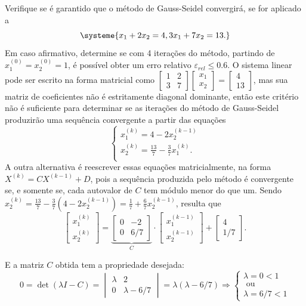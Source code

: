 \documentclass[12pt,a4paper]{article}
\begin{document}
\begin{ExerciseList}
\Exercise[title={2,5}]
Verifique se é garantido que o método de Gauss-Seidel convergirá, se for aplicado a
\[
\systeme{
 x_1 + 2x_2 = 4,
3x_1 + 7x_2 = 13.
}
\]
Em caso afirmativo, determine se com 4 iterações do método, partindo de $x_1^{(0)} = x_2^{(0)} = 1$, é possível obter um erro relativo $\varepsilon_{rel} \leq 0.6$.
\Answer O sistema linear pode ser escrito na forma matricial como
$
\begin{bmatrix}
1 & 2\\3 &7
\end{bmatrix}
\begin{bmatrix}
x_1\\x_2
\end{bmatrix}
=
\begin{bmatrix}
4\\13
\end{bmatrix}
$, mas sua matriz de coeficientes não é estritamente diagonal dominante, então este critério não é suficiente para determinar se as iterações do método de Gauss-Seidel produzirão uma sequência convergente a partir das equações
\[
\begin{cases}
x_1^{(k)} =  4 - 2x_2^{(k-1)}\\
x_2^{(k)} = \frac{13}{7} - \frac{3}{7} x_1^{(k)}.\\
\end{cases}
\]
A outra alternativa é reescrever essas equações matricialmente, na forma $X^{(k)} = C X^{(k-1)} + D$, pois a sequência produzida pelo método é convergente se, e somente se, cada autovalor de $C$ tem módulo menor do que um. Sendo $x_2^{(k)}
= \frac{13}{7} - \frac{3}{7}\left(4 - 2x_2^{(k-1)}\right)
= \frac{1}{7} + \frac{6}{7}x_2^{(k-1)}$, resulta que
\[
\begin{bmatrix}
x_1^{(k)}\\x_2^{(k)}
\end{bmatrix}
=
\underbrace{\begin{bmatrix}
0 & -2 \\ 0 & 6/7
\end{bmatrix}}_{C} \cdot
\begin{bmatrix}
x_1^{(k-1)}\\x_2^{(k-1)}
\end{bmatrix}
+
\begin{bmatrix}
4 \\ 1/7
\end{bmatrix}.
\]

E a matriz $C$ obtida tem a propriedade desejada:
\[
0 =
\det{(\lambda I - C)}
= \begin{vmatrix}
\lambda & 2 \\ 0 & \lambda - 6/7
\end{vmatrix}
= \lambda(\lambda - 6/7)
\Rightarrow
\begin{cases}
\lambda = 0 < 1\\
 \text{ ou }\\
\lambda = 6/7 < 1
\end{cases}
\]


\end{ExerciseList}
\end{document}
